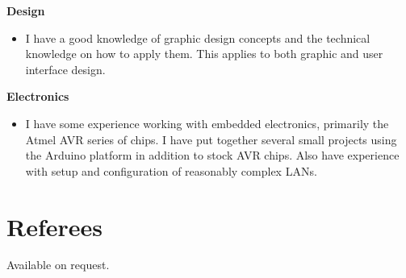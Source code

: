 \documentclass{res}
\begin{document}
\begin{resume}
  {\bf Design} 
        \begin{itemize}
        \item[] I have a good knowledge of graphic design concepts and the technical knowledge on how to apply them. This applies to both graphic and user interface design.
       \end{itemize}

   {\bf  Electronics} 
        \begin{itemize}
        \item[]  I have some experience working with embedded electronics, primarily the Atmel AVR series of chips. I have put together several small projects using the Arduino platform in addition to stock AVR chips. Also have experience with setup and configuration of reasonably complex LANs.
       \end{itemize} 

 
\section{Referees}
\vspace{0.1in} 
 
   Available on request.
    
 

\end{resume}
\end{document}
